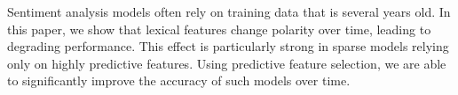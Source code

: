 Sentiment analysis models often rely on training data that is several years old. In this paper, we show that lexical features change polarity over time, leading to degrading performance. This effect is particularly strong in sparse models relying only on highly predictive features. Using predictive feature selection, we are able to significantly improve the accuracy of such models over time.
